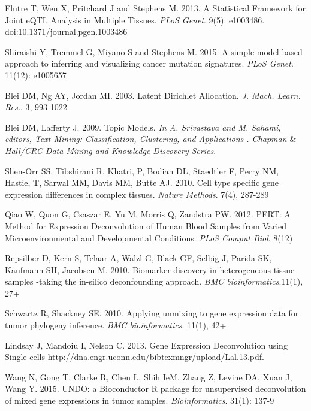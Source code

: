 \documentclass[10pt,letterpaper]{article}
\begin{document}
\begin{thebibliography}{9}

Flutre T,  Wen X,  Pritchard J and Stephens M. 2013.
A Statistical Framework for Joint eQTL Analysis in Multiple Tissues.
\textit{PLoS Genet}. 9(5): e1003486. doi:10.1371/journal.pgen.1003486

Shiraishi Y, Tremmel G, Miyano S and Stephens M. 2015.
 A simple model-based approach to inferring and visualizing cancer mutation signatures.
\textit{ PLoS Genet}. 11(12): e1005657


Blei DM,  Ng AY, Jordan MI. 2003.
Latent Dirichlet Allocation.
\textit{J. Mach. Learn. Res.}. 3, 993-1022

Blei DM, Lafferty J. 2009.
Topic Models.
\textit{In A. Srivastava and M. Sahami, editors, Text Mining: Classification, Clustering, and Applications . Chapman $\&$ Hall/CRC Data Mining and Knowledge Discovery Series}.

 Shen-Orr SS,  Tibshirani R,   Khatri, P,  Bodian DL,  Staedtler F,  Perry NM,  Hastie, T,   Sarwal MM,  Davis MM,  Butte AJ. 2010.
 Cell type specific gene expression   differences   in   complex   tissues.
 \textit{Nature   Methods}.  7(4),   287-289

Qiao W,  Quon G, Csaszar E, Yu  M,  Morris Q,  Zandstra  PW. 2012.
PERT: A   Method   for   Expression   Deconvolution   of   Human   Blood   Samples   from   Varied
Microenvironmental   and   Developmental   Conditions.
\textit{PLoS   Comput   Biol}.  8(12)

 Repsilber D,  Kern S,  Telaar A,  Walzl G,  Black GF,   Selbig   J,   Parida  SK,  Kaufmann SH,  Jacobsen M. 2010.
 Biomarker discovery in heterogeneous tissue samples -taking the in-silico deconfounding approach.
 \textit{BMC bioinformatics}.11(1), 27+

 Schwartz R, Shackney SE. 2010.
 Applying unmixing to gene expression data for tumor phylogeny inference.
 \textit{BMC bioinformatics}.  11(1), 42+

 Lindsay J,  Mandoiu I, Nelson C. 2013.
 Gene Expression Deconvolution using Single-cells
 \url{http://dna.engr.uconn.edu/bibtexmngr/upload/Lal.13.pdf}.

 Wang N, Gong T, Clarke R, Chen L, Shih IeM, Zhang Z, Levine DA, Xuan J, Wang Y.  2015.
 UNDO: a Bioconductor R package for unsupervised deconvolution of mixed gene expressions in tumor samples.
\textit{Bioinformatics}. 31(1): 137-9


\end{thebibliography}
\end{document}
